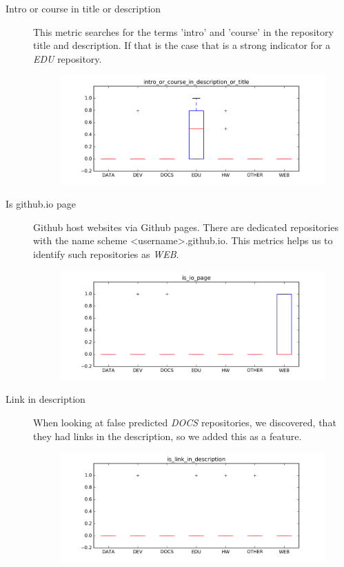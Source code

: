 \documentclass[a4paper]{scrartcl}
\begin{document}
\begin{description}
\begin{figure}[h!]
				\end{figure}
			\item[Intro or course in title or description]
				This metric searches for the terms 'intro' and 'course' in the repository title and description. If that is the case that is a strong indicator for a \emph{EDU} repository.
				\begin{figure}[h!]
					\centering
					\includegraphics[width=0.75\linewidth]{figures/intro_or_course_in_description_or_title.png}
				\end{figure}
			\item[Is github.io page]
				Github host websites via Github pages. There are dedicated repositories with the name scheme <username>.github.io. This metrics helps us to identify such repositories as \emph{WEB}.
				\begin{figure}[h!]
					\centering
					\includegraphics[width=0.75\linewidth]{figures/is_io_page.png}
				\end{figure}
			\item[Link in description]
				When looking at false predicted \emph{DOCS} repositories, we discovered, that they had links in the description, so we added this as a feature.
				\begin{figure}[h!]
					\centering
					\includegraphics[width=0.75\linewidth]{figures/is_link_in_description.png}

\end{figure}
\end{description}
\end{document}
